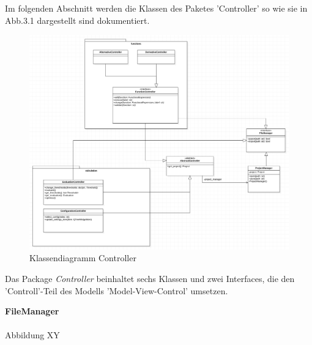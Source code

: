 \documentclass{article}
\begin{document}
Im folgenden Abschnitt werden die Klassen des Paketes 'Controller' so wie sie in Abb.3.1 dargestellt sind dokumentiert.

\begin{figure}[H]%
    \centering
    \includegraphics[width=13cm]{entwurf/Entwurf_dokument/img/Floriane/ControllerklassendiagrammTemporaer.png}
    \caption{Klassendiagramm Controller}
\end{figure}

Das Package \textit{Controller} beinhaltet sechs Klassen und zwei Interfaces, die den 'Controll'-Teil des Modells 'Model-View-Control' umsetzen.

\newpage
\textbf{\large{FileManager}}\\\\
Abbildung XY
\end{document}
